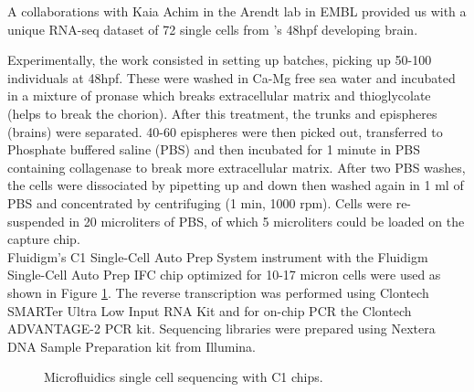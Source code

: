     	A collaborations with Kaia Achim in the Arendt lab in EMBL provided us with a unique RNA-seq dataset of 72 single cells from \platy{}'s 48hpf developing brain. 
    	
	Experimentally, the work consisted in setting up \platy{} batches, picking up 50-100 individuals at 48hpf. These were washed in Ca-Mg free sea water and incubated in a mixture of pronase which breaks extracellular matrix and thioglycolate (helps to break the chorion). After this treatment, the trunks and epispheres (brains) were separated. 40-60 epispheres were then picked out, transferred to Phosphate buffered saline (PBS) and then incubated for 1 minute in PBS containing collagenase to break more extracellular matrix. After two PBS washes, the cells were dissociated by pipetting up and down then washed again in 1 ml of PBS and concentrated by centrifuging (1 min, 1000 rpm). Cells were re-suspended in 20 microliters of PBS, of which 5 microliters could be loaded on the capture chip.\\

	Fluidigm's C1 Single-Cell Auto Prep System instrument with the Fluidigm Single-Cell Auto Prep IFC chip optimized for 10-17 micron cells were used as shown in Figure \ref{fig:singlecell_chip}. The reverse transcription was performed using Clontech SMARTer Ultra Low Input RNA Kit and for on-chip PCR the Clontech ADVANTAGE-2 PCR kit. Sequencing libraries were prepared using Nextera DNA Sample Preparation kit from Illumina.\\
	
\begin{figure}[h]
        \myfloatalign
         \quad
        \caption{Microfluidics single cell sequencing with C1 chips.}\label{fig:singlecell_chip}
\end{figure}
	

